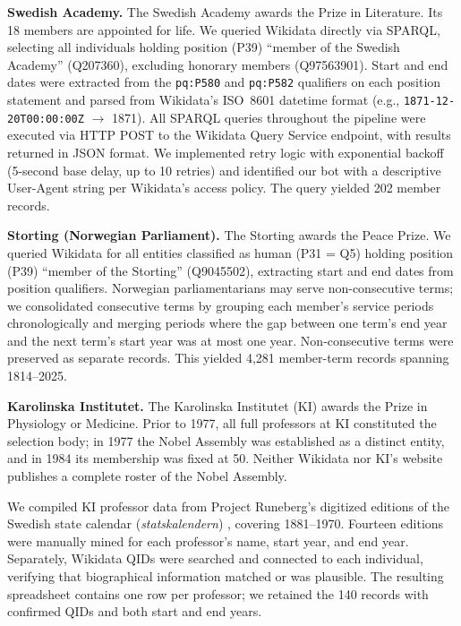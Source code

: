 \documentclass[11pt]{article}
\begin{document}
\textbf{Swedish Academy.} The Swedish Academy awards the Prize in Literature. Its 18 members are appointed for life. We queried Wikidata directly via SPARQL, selecting all individuals holding position (P39) ``member of the Swedish Academy'' (Q207360), excluding honorary members (Q97563901). Start and end dates were extracted from the \texttt{pq:P580} and \texttt{pq:P582} qualifiers on each position statement and parsed from Wikidata's ISO~8601 datetime format (e.g., \texttt{1871-12-20T00:00:00Z} $\to$ 1871). All SPARQL queries throughout the pipeline were executed via HTTP POST to the Wikidata Query Service endpoint, with results returned in JSON format. We implemented retry logic with exponential backoff (5-second base delay, up to 10 retries) and identified our bot with a descriptive User-Agent string per Wikidata's access policy. The query yielded 202 member records.

\textbf{Storting (Norwegian Parliament).} The Storting awards the Peace Prize. We queried Wikidata for all entities classified as human (P31 = Q5) holding position (P39) ``member of the Storting'' (Q9045502), extracting start and end dates from position qualifiers. Norwegian parliamentarians may serve non-consecutive terms; we consolidated consecutive terms by grouping each member's service periods chronologically and merging periods where the gap between one term's end year and the next term's start year was at most one year. Non-consecutive terms were preserved as separate records. This yielded 4{,}281 member-term records spanning 1814--2025.

\textbf{Karolinska Institutet.} The Karolinska Institutet (KI) awards the Prize in Physiology or Medicine. Prior to 1977, all full professors at KI constituted the selection body; in 1977 the Nobel Assembly was established as a distinct entity, and in 1984 its membership was fixed at 50. Neither Wikidata nor KI's website publishes a complete roster of the Nobel Assembly.

We compiled KI professor data from Project Runeberg's digitized editions of the Swedish state calendar (\emph{statskalendern}) \citep{KarolinskaEmployees}, covering 1881--1970. Fourteen editions were manually mined for each professor's name, start year, and end year. Separately, Wikidata QIDs were searched and connected to each individual, verifying that biographical information matched or was plausible. The resulting spreadsheet contains one row per professor; we retained the 140 records with confirmed QIDs and both start and end years.
\end{document}
